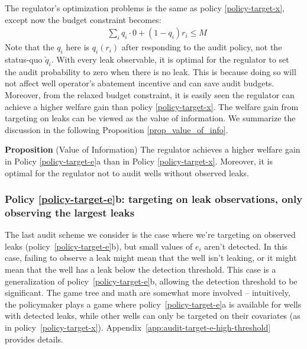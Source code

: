 \documentclass[12pt,oneside,letterpaper]{article}
\newcounter{propositioncounter}
\newlength{\premathenv}
\newlength{\withinmathenv}
\newlength{\postmathenv}
\theoremstyle{definition}
\newenvironment{proposition}[1]{%
\vspace{\premathenv}%
\refstepcounter{propositioncounter}%
\noindent\textbf{Proposition \thepropositioncounter}
{#1}
\vspace{\withinmathenv}
}{%
\vspace{\postmathenv}%
}
\begin{document}
\begin{refsection}
The regulator's optimization problems is the same as policy \ref{policy-target-x}, except now the budget constraint becomes:
\begin{align*}
&\sum_i q_i \cdot 0 + (1 - q_i) r_i \leq M
\end{align*}
Note that the \(q_i\) here is \(q_i(r_i)\) after responding to the audit policy, not the status-quo \(\tilde{q}_i\). With every leak observable, it is optimal for the regulator to set the audit probability to zero when there is no leak. This is because doing so will not affect well operator's abatement incentive and can save audit budgets. Moreover, from the relaxed budget constraint, it is easily seen the regulator can achieve a higher welfare gain than policy \ref{policy-target-x}. The welfare gain from targeting on leaks can be viewed as the value of information. We summarize the discussion in the following Proposition \autoref{prop_value_of_info}.

\begin{proposition}{(Value of Information)} \label{prop_value_of_info}
    The regulator achieves a higher welfare gain in Policy \ref{policy-target-e}a than in Policy \ref{policy-target-x}. Moreover, it is optimal for the regulator not to audit wells without observed leaks.
\end{proposition}

\subsubsection{Policy \ref{policy-target-e}b: targeting on leak observations, only observing the largest leaks}

The last audit scheme we consider is the case where we're targeting on observed leaks (policy~\ref{policy-target-e}b), but small values of \(e_i\) aren't detected.
In this case, failing to observe a leak might mean that the well isn't leaking, or it might mean that the well has a leak below the detection threshold.
This case is a generalization of policy~\ref{policy-target-e}b, allowing the detection threshold to be significant.
The game tree and math are somewhat more involved -- intuitively, the policymaker plays a game where policy~\ref{policy-target-e}a is available for wells with detected leaks, while other wells can only be targeted on their covariates (as in policy~\ref{policy-target-x}).
Appendix~\ref{app:audit-target-e-high-threshold} provides details.




\end{refsection}
\end{document}
